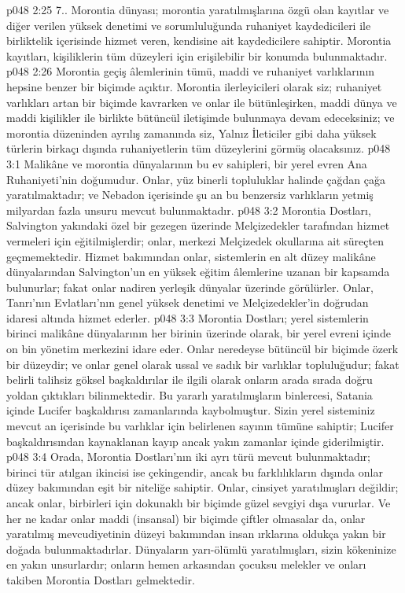 \vs p048 2:25 7.\bibnobreakspace {}. Morontia dünyası; morontia yaratılmışlarına özgü olan kayıtlar ve diğer verilen yüksek denetimi ve sorumluluğunda ruhaniyet kaydedicileri ile birliktelik içerisinde hizmet veren, kendisine ait kaydedicilere sahiptir. Morontia kayıtları, kişiliklerin tüm düzeyleri için erişilebilir bir konumda bulunmaktadır.
\vs p048 2:26 Morontia geçiş âlemlerinin tümü, maddi ve ruhaniyet varlıklarının hepsine benzer bir biçimde açıktır. Morontia ilerleyicileri olarak siz; ruhaniyet varlıkları artan bir biçimde kavrarken ve onlar ile bütünleşirken, maddi dünya ve maddi kişilikler ile birlikte bütüncül iletişimde bulunmaya devam edeceksiniz; ve morontia düzeninden ayrılış zamanında siz, Yalnız İleticiler gibi daha yüksek türlerin birkaçı dışında ruhaniyetlerin tüm düzeylerini görmüş olacaksınız.
\vs p048 3:1 Malikâne ve morontia dünyalarının bu ev sahipleri, bir yerel evren Ana Ruhaniyeti’nin doğumudur. Onlar, yüz binerli topluluklar halinde çağdan çağa yaratılmaktadır; ve Nebadon içerisinde şu an bu benzersiz varlıkların yetmiş milyardan fazla unsuru mevcut bulunmaktadır.
\vs p048 3:2 Morontia Dostları, Salvington yakındaki özel bir gezegen üzerinde Melçizedekler tarafından hizmet vermeleri için eğitilmişlerdir; onlar, merkezi Melçizedek okullarına ait süreçten geçmemektedir. Hizmet bakımından onlar, sistemlerin en alt düzey malikâne dünyalarından Salvington’un en yüksek eğitim âlemlerine uzanan bir kapsamda bulunurlar; fakat onlar nadiren yerleşik dünyalar üzerinde görülürler. Onlar, Tanrı’nın Evlatları’nın genel yüksek denetimi ve Melçizedekler’in doğrudan idaresi altında hizmet ederler.
\vs p048 3:3 Morontia Dostları; yerel sistemlerin birinci malikâne dünyalarının her birinin üzerinde olarak, bir yerel evreni içinde on bin yönetim merkezini idare eder. Onlar neredeyse bütüncül bir biçimde özerk bir düzeydir; ve onlar genel olarak ussal ve sadık bir varlıklar topluluğudur; fakat belirli talihsiz göksel başkaldırılar ile ilgili olarak onların arada sırada doğru yoldan çıktıkları bilinmektedir. Bu yararlı yaratılmışların binlercesi, Satania içinde Lucifer başkaldırısı zamanlarında kaybolmuştur. Sizin yerel sisteminiz mevcut an içerisinde bu varlıklar için belirlenen sayının tümüne sahiptir; Lucifer başkaldırısından kaynaklanan kayıp ancak yakın zamanlar içinde giderilmiştir.
\vs p048 3:4 Orada, Morontia Dostları’nın iki ayrı türü mevcut bulunmaktadır; birinci tür atılgan ikincisi ise çekingendir, ancak bu farklılıkların dışında onlar düzey bakımından eşit bir niteliğe sahiptir. Onlar, cinsiyet yaratılmışları değildir; ancak onlar, birbirleri için dokunaklı bir biçimde güzel sevgiyi dışa vururlar. Ve her ne kadar onlar maddi (insansal) bir biçimde çiftler olmasalar da, onlar yaratılmış mevcudiyetinin düzeyi bakımından insan ırklarına oldukça yakın bir doğada bulunmaktadırlar. Dünyaların yarı\hyp{}ölümlü yaratılmışları, sizin kökeninize en yakın unsurlardır; onların hemen arkasından çocuksu melekler ve onları takiben Morontia Dostları gelmektedir.
